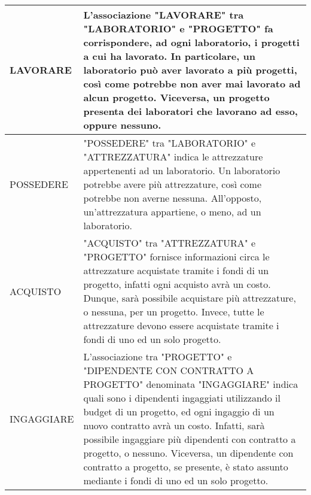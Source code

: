 \begin{tabular}{|C{3cm}|L{11.7cm}|}
            \hline
                LAVORARE &
                L'associazione "LAVORARE" tra "LABORATORIO" e "PROGETTO" fa corrispondere, ad ogni laboratorio, i progetti a cui ha lavorato. In particolare, un laboratorio può aver lavorato a più progetti, così come potrebbe non aver mai lavorato ad alcun progetto. Viceversa, un progetto presenta dei laboratori che lavorano ad esso, oppure nessuno.\\
            \hline
                POSSEDERE &
                "POSSEDERE" tra "LABORATORIO" e "ATTREZZATURA" indica le attrezzature appertenenti ad un laboratorio. Un laboratorio potrebbe avere più attrezzature, così come potrebbe non averne nessuna. All'opposto, un'attrezzatura appartiene, o meno, ad un laboratorio.\\
            \hline
                ACQUISTO &
                "ACQUISTO" tra "ATTREZZATURA" e "PROGETTO" fornisce informazioni circa le attrezzature acquistate tramite i fondi di un progetto, infatti ogni acquisto avrà un costo. Dunque, sarà possibile acquistare più attrezzature, o nessuna, per un progetto. Invece, tutte le attrezzature devono essere acquistate tramite i fondi di uno ed un solo progetto.\\
            \hline
                INGAGGIARE &
                L'associazione tra "PROGETTO" e "DIPENDENTE CON CONTRATTO A PROGETTO" denominata "INGAGGIARE" indica quali sono i dipendenti ingaggiati utilizzando il budget di un progetto, ed ogni ingaggio di un nuovo contratto avrà un costo. Infatti, sarà possibile ingaggiare più dipendenti con contratto a progetto, o nessuno. Viceversa, un dipendente con contratto a progetto, se presente, è stato assunto mediante i fondi di uno ed un solo progetto.\\
            \hline
        \end{tabular}
